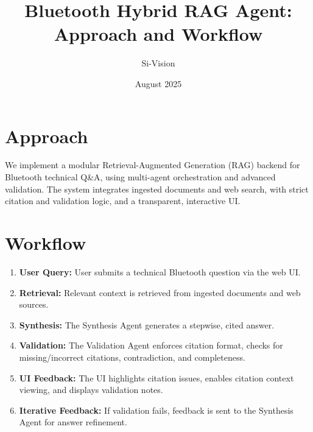 \documentclass{article}
\title{Bluetooth Hybrid RAG Agent: Approach and Workflow}
\author{Si-Vision}
\date{August 2025}
\begin{document}
\maketitle
\section*{Approach}
We implement a modular Retrieval-Augmented Generation (RAG) backend for Bluetooth technical Q\&A, using multi-agent orchestration and advanced validation. The system integrates ingested documents and web search, with strict citation and validation logic, and a transparent, interactive UI.

\section*{Workflow}
\begin{enumerate}[leftmargin=*, itemsep=0.5em]
  \item \textbf{User Query:} User submits a technical Bluetooth question via the web UI.
  \item \textbf{Retrieval:} Relevant context is retrieved from ingested documents and web sources.
  \item \textbf{Synthesis:} The Synthesis Agent generates a stepwise, cited answer.
  \item \textbf{Validation:} The Validation Agent enforces citation format, checks for missing/incorrect citations, contradiction, and completeness.
  \item \textbf{UI Feedback:} The UI highlights citation issues, enables citation context viewing, and displays validation notes.
  \item \textbf{Iterative Feedback:} If validation fails, feedback is sent to the Synthesis Agent for answer refinement.
\end{enumerate}
\end{document}
